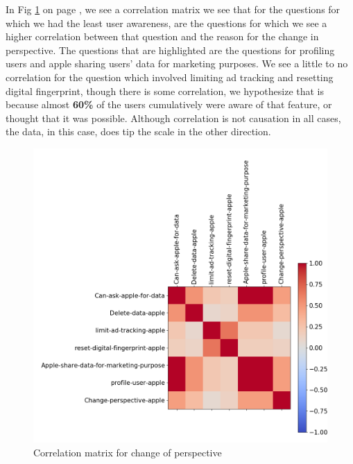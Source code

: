 \documentclass[sigconf]{acmart}
\begin{document}
In Fig \ref{fig:change} on page \pageref{fig:change}, we see a correlation matrix we see that for the questions for which we had the least user awareness, are the questions for which we see a higher correlation between that question and the reason for the change in perspective. The questions that are highlighted are the questions for profiling users and apple sharing users' data for marketing purposes. We see a little to no correlation for the question which involved limiting ad tracking and resetting digital fingerprint, though there is some correlation, we hypothesize that is because almost \textbf{60\%} of the users cumulatively were aware of that feature, or thought that it was possible. Although correlation is not causation in all cases, the data, in this case, does tip the scale in the other direction.

\begin{figure}[h]
  \centering
  \includegraphics[width=\linewidth]{05-changePerspective-1.png}
  \caption{Correlation matrix for change of perspective}
  \label{fig:change}
\end{figure}
\end{document}

